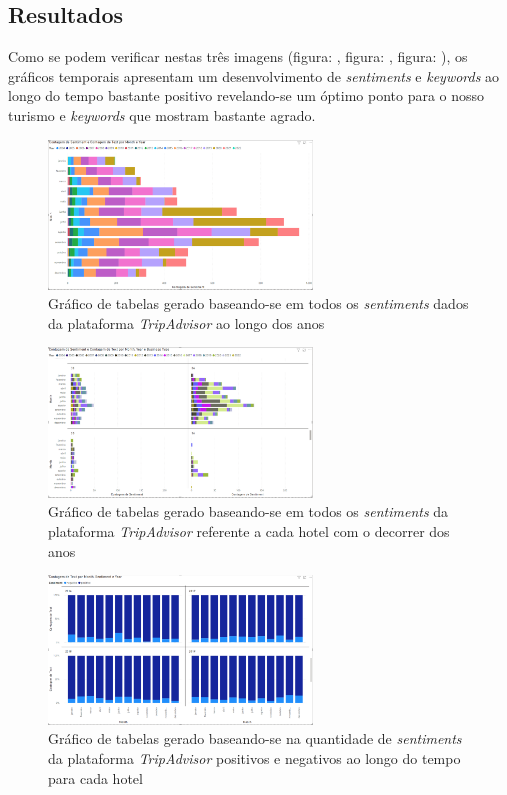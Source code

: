 \subsection{Resultados}

Como se podem verificar nestas três imagens (figura: \cite{fig:exemplofigqntsntmyear},  figura: \cite{fig:exemplofigqntyearbus}, figura: \cite{fig:exemplofigposneg}), os gráficos temporais apresentam um desenvolvimento de \textit{sentiments} e \textit{keywords} ao longo do tempo bastante positivo revelando-se um óptimo ponto para o nosso turismo e \textit{keywords} que mostram bastante agrado. 

\begin{figure}[!htb]
\centering
\includegraphics[width=7cm]{figuras/NrReviewsPerYear/TableGraph6.PNG}
\caption{Gráfico de tabelas gerado baseando-se em todos os \textit{sentiments} dados da plataforma \textit{TripAdvisor} ao longo dos anos}
\label{fig:exemplofigqntsntmyear}
\end{figure}

\begin{figure}[!htb]
\centering
\includegraphics[width=7cm]{figuras/NrReviewsPerYear&BusinessType/8.PNG}
\caption{Gráfico de tabelas gerado baseando-se em todos os \textit{sentiments} da plataforma \textit{TripAdvisor} referente a cada hotel com o decorrer dos anos}
\label{fig:exemplofigqntyearbus}
\end{figure}

\begin{figure}[!htb]
\centering
\includegraphics[width=7cm]{figuras/Pos&NegSentiments/TableGraph4.PNG}
\caption{Gráfico de tabelas gerado baseando-se na quantidade de \textit{sentiments} da plataforma \textit{TripAdvisor} positivos e negativos ao longo do tempo para cada hotel}
\label{fig:exemplofigposneg}
\end{figure}